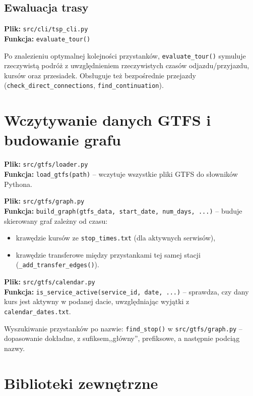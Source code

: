 \documentclass[12pt,a4paper]{article}
\begin{document}
\subsection{Ewaluacja trasy}

\textbf{Plik:} \texttt{src/cli/tsp\_cli.py}\\
\textbf{Funkcja:} \texttt{evaluate\_tour()}

Po znalezieniu optymalnej kolejności przystanków, \texttt{evaluate\_tour()} symuluje
rzeczywistą podróż z uwzględnieniem rzeczywistych czasów odjazdu/przyjazdu, kursów
oraz przesiadek. Obsługuje też bezpośrednie przejazdy (\texttt{check\_direct\_connections},
\texttt{find\_continuation}).

\section{Wczytywanie danych GTFS i budowanie grafu}

\textbf{Plik:} \texttt{src/gtfs/loader.py}\\
\textbf{Funkcja:} \texttt{load\_gtfs(path)} -- wczytuje wszystkie pliki GTFS do
słowników Pythona.

\textbf{Plik:} \texttt{src/gtfs/graph.py}\\
\textbf{Funkcja:} \texttt{build\_graph(gtfs\_data, start\_date, num\_days, ...)} --
buduje skierowany graf zależny od czasu:
\begin{itemize}
    \item krawędzie kursów ze \texttt{stop\_times.txt} (dla aktywnych serwisów),
    \item krawędzie transferowe między przystankami tej samej stacji
          (\texttt{\_add\_transfer\_edges()}).
\end{itemize}

\textbf{Plik:} \texttt{src/gtfs/calendar.py}\\
\textbf{Funkcja:} \texttt{is\_service\_active(service\_id, date, ...)} -- sprawdza,
czy dany kurs jest aktywny w podanej dacie, uwzględniając wyjątki z
\texttt{calendar\_dates.txt}.

Wyszukiwanie przystanków po nazwie: \texttt{find\_stop()} w \texttt{src/gtfs/graph.py}
-- dopasowanie dokładne, z sufiksem,,główny'', prefiksowe, a następnie podciąg nazwy.

\section{Biblioteki zewnętrzne}
\end{document}
